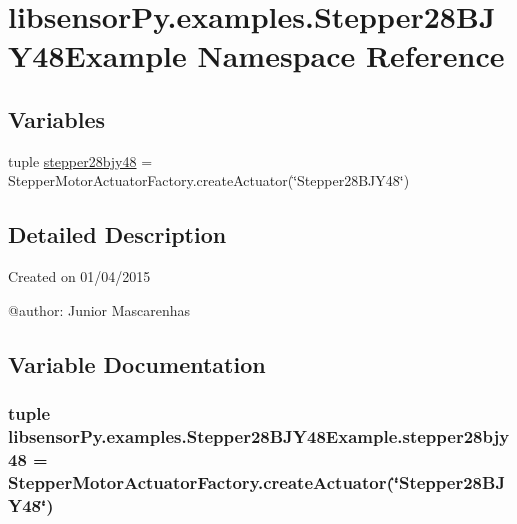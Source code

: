 \hypertarget{namespacelibsensorPy_1_1examples_1_1Stepper28BJY48Example}{}\section{libsensor\+Py.\+examples.\+Stepper28\+B\+J\+Y48\+Example Namespace Reference}
\label{namespacelibsensorPy_1_1examples_1_1Stepper28BJY48Example}
\subsection*{Variables}
\begin{DoxyCompactItemize}
\item 
tuple \hyperlink{namespacelibsensorPy_1_1examples_1_1Stepper28BJY48Example_abd9aeb579feb07f0b01aebfb7bdec8b1}{stepper28bjy48} = Stepper\+Motor\+Actuator\+Factory.\+create\+Actuator(\char`\"{}Stepper28\+B\+J\+Y48\char`\"{})
\end{DoxyCompactItemize}


\subsection{Detailed Description}
\begin{DoxyVerb}Created on 01/04/2015

@author: Junior Mascarenhas
\end{DoxyVerb}
 

\subsection{Variable Documentation}
\hypertarget{namespacelibsensorPy_1_1examples_1_1Stepper28BJY48Example_abd9aeb579feb07f0b01aebfb7bdec8b1}{}
\subsubsection[{stepper28bjy48}]{\setlength{\rightskip}{0pt plus 5cm}tuple libsensor\+Py.\+examples.\+Stepper28\+B\+J\+Y48\+Example.\+stepper28bjy48 = Stepper\+Motor\+Actuator\+Factory.\+create\+Actuator(\char`\"{}Stepper28\+B\+J\+Y48\char`\"{})}\label{namespacelibsensorPy_1_1examples_1_1Stepper28BJY48Example_abd9aeb579feb07f0b01aebfb7bdec8b1}
